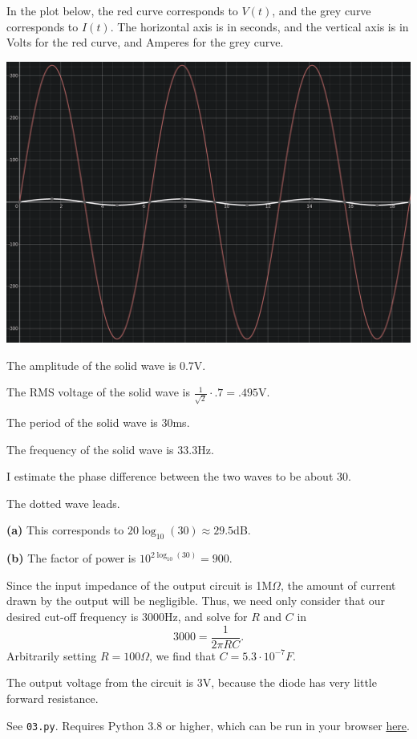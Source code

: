\documentclass{article}
\begin{document}
In the plot below, the red curve corresponds to $V(t)$, and the grey curve corresponds to $I(t)$. The horizontal axis is in seconds, and the vertical axis is in Volts for the red curve, and Amperes for the grey curve.
\begin{center}
    \includegraphics[scale=.5]{plot.png}
\end{center}

\newpage{}

The amplitude of the solid wave is 0.7V.

The RMS voltage of the solid wave is $\frac{1}{\sqrt{2}}\cdot .7 = .495$V.

The period of the solid wave is 30ms.

The frequency of the solid wave is $33.3$Hz.

I estimate the phase difference between the two waves to be about 30\degree.

The dotted wave leads.

\bigskip{}

{\bf (a)} This corresponds to $20\log_{10}(30) \approx 29.5$dB.

{\bf (b)} The factor of power is $10^{2\log_{10}(30)} = 900$.

\bigskip{}

    Since the input impedance of the output circuit is 1M$\Omega$, the amount of current drawn by the output will be negligible.
    Thus, we need only consider that our desired cut-off frequency is 3000Hz, and solve for $R$ and $C$ in $$3000 = \frac{1}{2\pi RC}.$$
    Arbitrarily setting $R=100\Omega$, we find that $C=5.3 \cdot 10^{-7}F$.

\bigskip{}

    The output voltage from the circuit is 3V, because the diode has very little forward resistance.

\bigskip{}

    See \texttt{03.py}. Requires Python 3.8 or higher, which can be run in your browser {\color{red} \href{https://repl.it/languages/python3}{here}}.
\end{document}
